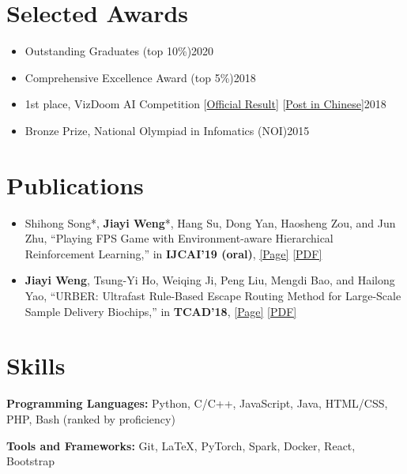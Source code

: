 \documentclass{resume}
\begin{document}
\section{Selected Awards}
\begin{itemize}
    \item Outstanding Graduates (top 10\%)\hfill 2020
    \item Comprehensive Excellence Award (top 5\%)\hfill 2018
    \item 1st place, VizDoom AI Competition [\href{http://vizdoom.cs.put.edu.pl/competitions/vdaic-2018-cig/results}{Official Result}] [\href{https://www.jiqizhixin.com/articles/2018-08-23-12}{Post in Chinese}]\hfill 2018
    \item Bronze Prize, National Olympiad in Infomatics (NOI)\hfill 2015
\end{itemize}

\section{Publications}
\begin{itemize}
    \item Shihong Song*, \textbf{Jiayi Weng}*, Hang Su, Dong Yan, Haosheng Zou, and Jun Zhu, ``Playing FPS Game with Environment-aware Hierarchical Reinforcement Learning,'' in \textbf{IJCAI'19 (oral)}, \href{https://trinkle23897.github.io/cv/viz2018.html}{[Page]} \href{https://www.ijcai.org/proceedings/2019/0482.pdf}{[PDF]}
    \item \textbf{Jiayi Weng}, Tsung-Yi Ho, Weiqing Ji, Peng Liu, Mengdi Bao, and Hailong Yao,  ``URBER: Ultrafast Rule-Based Escape Routing Method for Large-Scale Sample Delivery Biochips,'' in \textbf{TCAD'18}, \href{https://trinkle23897.github.io/cv/urber.html}{[Page]} \href{https://ieeexplore.ieee.org/document/8552446}{[PDF]}
\end{itemize}

\section{Skills}
\textbf{Programming Languages:} \small Python, C/C++, JavaScript, Java, HTML/CSS, PHP, Bash (ranked by proficiency)

\textbf{Tools and Frameworks:} \small Git, \LaTeX, PyTorch, Spark, Docker, React, Bootstrap
\end{document}
